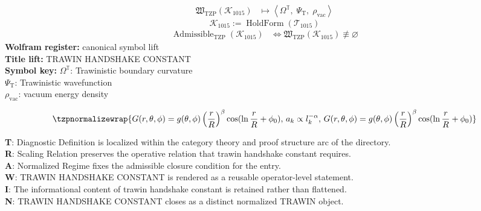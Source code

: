 \noindent
\begin{minipage}[t]{0.48\linewidth}
\begingroup
\small
\[
\begin{aligned}
\mathfrak{W}_{\mathrm{TZP}}\!\left(\mathcal{K}_{1015}\right)
&\longmapsto
\left\langle \Omega^{\mathbb{T}},\; \Psi_{\mathrm{T}},\; \rho_{\mathrm{vac}} \right\rangle
\end{aligned}
\]
\[
\mathcal{K}_{1015}
:=
\operatorname{HoldForm}\!\left(\mathcal{T}_{1015}\right)
\]
\[
\begin{aligned}
\operatorname{Admissible}_{\mathrm{TZP}}\!\left(\mathcal{K}_{1015}\right)
&\Longleftrightarrow
\mathfrak{W}_{\mathrm{TZP}}\!\left(\mathcal{K}_{1015}\right)\not\equiv\varnothing
\end{aligned}
\]
\textbf{Wolfram register:} canonical symbol lift\\
\textbf{Title lift:} TRAWIN HANDSHAKE CONSTANT\\
\textbf{Symbol key:} \(\Omega^{\mathbb{T}}\): Trawinistic boundary curvature\\ \(\Psi_{\mathrm{T}}\): Trawinistic wavefunction\\ \(\rho_{\mathrm{vac}}\): vacuum energy density
\par
\endgroup
\end{minipage}\hfill
\begin{minipage}[t]{0.48\linewidth}
\[
\tzpnormalizewrap{G(r, \theta, \phi) = g(\theta, \phi) \left(\frac{r}{R}\right)^\beta \cos(\ln \frac{r}{R} + \phi_0),\,a_k \propto l_k^{-\alpha},\,G(r, \theta, \phi) = g(\theta, \phi) \left(\frac{r}{R}\right)^\beta \cos(\ln \frac{r}{R} + \phi_0)}
\]

\small
\textbf{T}: Diagnostic Definition is localized within the category theory and proof structure arc of the directory.\\
\textbf{R}: Scaling Relation preserves the operative relation that trawin handshake constant requires.\\
\textbf{A}: Normalized Regime fixes the admissible closure condition for the entry.\\
\textbf{W}: TRAWIN HANDSHAKE CONSTANT is rendered as a reusable operator-level statement.\\
\textbf{I}: The informational content of trawin handshake constant is retained rather than flattened.\\
\textbf{N}: TRAWIN HANDSHAKE CONSTANT closes as a distinct normalized TRAWIN object.
\normalsize
\end{minipage}

